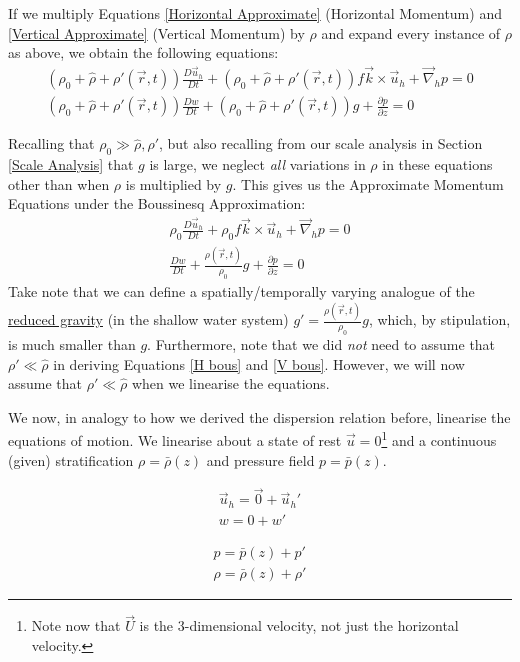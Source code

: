 If we multiply Equations \ref{Horizontal Approximate} (Horizontal Momentum) and \ref{Vertical Approximate} (Vertical Momentum) by $\rho$ and expand every instance of $\rho$ as above, we obtain the following equations:
\begin{align*}
    (\rho_0+\hat{\rho}+\rho'(\vec{r},t))\frac{D\vec{u}_h}{Dt}+(\rho_0+\hat{\rho}+\rho'(\vec{r},t))f\vec{k}\times\vec{u}_h + \vec{\nabla}_h p = 0
    \\
    (\rho_0+\hat{\rho}+\rho'(\vec{r},t))\frac{Dw}{Dt}
    +
    (\rho_0+\hat{\rho}+\rho'(\vec{r},t))g + \frac{\partial p}{\partial z}= 0
\end{align*}

Recalling that $\rho_0 \gg \hat{\rho}, \rho'$, but also recalling from our scale analysis in Section \ref{Scale Analysis} that $g$ is large, we neglect \textit{all} variations in $\rho$ in these equations other than when $\rho$ is multiplied by $g$. This gives us the Approximate Momentum Equations under the Boussinesq Approximation:
\begin{align}
    \label{H bous}
    \boxed{
        \rho_0\frac{D\vec{u}_h}{Dt}+\rho_0f\vec{k}\times\vec{u}_h + \vec{\nabla}_h p = 0
    }
    \\
    \label{V bous}
    \boxed{\frac{Dw}{Dt}
    +
    \frac{\rho(\vec{r},t)}{\rho_0}g + \frac{\partial p}{\partial z}= 0}
\end{align}
Take note that we can define a spatially/temporally varying analogue of the \hyperref[RG Box]{reduced gravity} (in the shallow water system) $g'=\frac{\rho(\vec{r},t)}{\rho_0}g$, which, by stipulation, is much smaller than $g$. Furthermore, note that we did \textit{not} need to assume that $\rho'\ll \hat{\rho}$ in deriving Equations \ref{H bous} and \ref{V bous}. However, we will now assume that $\rho'\ll \hat{\rho}$ when we linearise the equations.

We now, in analogy to how we derived the dispersion relation before, linearise the equations of motion. We linearise about a state of rest $\vec{u}=0$\footnote{Note now that $\vec{U}$ is the 3-dimensional velocity, not just the horizontal velocity.} and a continuous (given) stratification $\rho=\bar{\rho}(z)$ and pressure field $p=\bar{p}(z)$.

\begin{minipage}{0.48\linewidth}
    \begin{align*}
        \vec{u}_h = \vec{0}+\vec{u}_h'\\
        w = 0 + w'
    \end{align*}
\end{minipage}
\hfill
\begin{minipage}{0.48\linewidth}
    \begin{align*}
        p = \bar{p}(z)+p'\\
        \rho = \bar{\rho}(z) + \rho'
    \end{align*}
\end{minipage}

